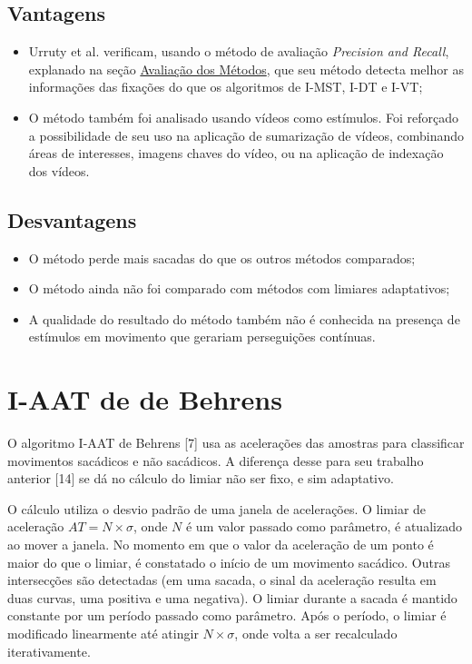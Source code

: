 \documentclass[brazil,]{report}
\begin{document}
\subsection{Vantagens}\label{vantagens-8}

\begin{itemize}
\itemsep1pt\parskip0pt
\item
  Urruty et al. verificam, usando o método de avaliação \emph{Precision
  and Recall}, explanado na seção
  \hyperref[avaliauxe7uxe3o-dos-muxe9todos]{Avaliação dos Métodos}, que
  seu método detecta melhor as informações das fixações do que os
  algoritmos de \gls{I-MST}, \gls{I-DT} e \gls{I-VT};
\item
  O método também foi analisado usando vídeos como estímulos. Foi
  reforçado a possibilidade de seu uso na aplicação de sumarização de
  vídeos, combinando áreas de interesses, imagens chaves do vídeo, ou na
  aplicação de indexação dos vídeos.
\end{itemize}

\subsection{Desvantagens}\label{desvantagens-8}

\begin{itemize}
\itemsep1pt\parskip0pt
\item
  O método perde mais sacadas do que os outros métodos comparados;
\item
  O método ainda não foi comparado com métodos com limiares adaptativos;
\item
  A qualidade do resultado do método também não é conhecida na presença
  de estímulos em movimento que gerariam perseguições contínuas.
\end{itemize}

\section{I-AAT de de Behrens}\label{i-aat-de-de-behrens}

O algoritmo \gls{I-AAT} de Behrens {[}7{]} usa as acelerações das
amostras para classificar movimentos sacádicos e não sacádicos. A
diferença desse para seu trabalho anterior {[}14{]} se dá no cálculo do
limiar não ser fixo, e sim adaptativo.

O cálculo utiliza o desvio padrão de uma janela de acelerações. O limiar
de aceleração $AT = N\times\sigma$, onde $N$ é um valor passado como
parâmetro, é atualizado ao mover a janela. No momento em que o valor da
aceleração de um ponto é maior do que o limiar, é constatado o início de
um movimento sacádico. Outras intersecções são detectadas (em uma
sacada, o sinal da aceleração resulta em duas curvas, uma positiva e uma
negativa). O limiar durante a sacada é mantido constante por um período
passado como parâmetro. Após o período, o limiar é modificado
linearmente até atingir $N\times\sigma$, onde volta a ser recalculado
iterativamente.
\end{document}

